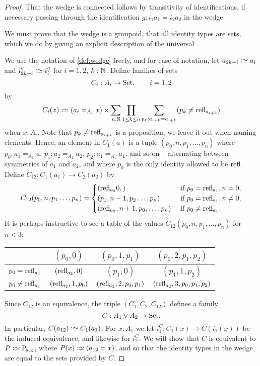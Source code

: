 \begin{proof}
  That the wedge is connected follows by transitivity of identifications,
  if necessary passing through the identification $g:i_1a_1=i_2a_2$ in the wedge.

We must prove that the wedge is a groupoid, \ie that all identity types are sets, which we do by giving an explicit description of the universal \covering.

 We use the notation of \cref{def:wedge} freely, and for ease of notation, let $a_{2k+i}\defequi a_i$ and $i_{2k+i}^g\defequi i_i^g$ for $i=1,2$, $k:\mathbb{N}$.
Define families of sets
$$C_i:A_i\to\mathrm{Set},\qquad i=1,2$$
by
$$
C_i(x)\defequi(a_i=_{A_i}x)\times
\sum_{n:\NN}\prod_{1\leq k\leq n}\sum_{p_k:a_{i+k}= a_{i+k}}(p_k\neq\refl {a_{i+k}})
$$
when $x:A_i$.  Note that $p_k\neq\mathrm{refl}_{a_{i+k}}$  is a proposition; we leave it out when naming elements. Hence, an element in $C_1(a)$ is a tuple
$(p_0,n,p_1,\dots,p_n)$ where $p_0:a_1=_{A_1}a$, $p_1:a_2=_{A_2}a_2$, $p_2:a_1=_{A_1}a_1$, and so on -- alternating between symmetries of $a_1$ and $a_2$, and where $p_0$ is the only identity allowed to be $\mathrm{refl}_{}$. Define $C_{12}:C_1(a_1)\to C_2(a_2)$ by
$$C_{12}(p_0,n,p_1\dots,p_n)=
\begin{cases}
  (\mathrm{refl}_{a_2}0,)&\text{ if }p_0=\mathrm{refl}_{a_1}, n=0,\\
  (p_1,n-1,p_2\dots,p_n)& \text{ if }p_0=\mathrm{refl}_{a_1},n\neq0,\\
  (\mathrm{refl}_{a_2},n+1,p_0,\dots,p_n)& \text{ if }p_0\neq\mathrm{refl}_{a_1}.
\end{cases}
$$
It is perhaps instructive to see a table of the values $C_{12}(p_0,n,p_1,\dots,p_n)$ for $n<3$:
\begin{center}
  \begin{tabular}{r|c cc}
    &$(p_0,0)$&$(p_0,1,p_1)$&$(p_0,2,p_1,p_2)$\\
    \hline
    $p_0=\mathrm{refl}_{a_1}$&$(\mathrm{refl}_{a_2},0)$&$(p_1,0)$&$(p_1,1,p_2)$\\
    $p_0\neq\mathrm{refl}_{a_1}$&$(\mathrm{refl}_{a_2},1,p_0)$&$(\mathrm{refl}_{a_2},2,p_0,p_1)$&$(\mathrm{refl}_{a_2},3,p_0,p_1,p_2)$
  \end{tabular}
\end{center}
Since $C_{12}$ is an equivalence, the triple $(C_1,C_2,C_{12})$ defines a family
$$C:A_1\vee A_2\to\mathrm{Set}.$$
In particular, $C(a_{12})\defequi C_1(a_1)$.
For $x:A_1$ we let $i^C_1:C_1(x)\to C(i_1(x))$ be the induced equivalence, and likewise for $i^C_2$.
We will show that $C$ is equivalent to $P\defequi \pathsp{a_{12}}$, where $P(x)\defequi(a_{12}=x)$, and so that the identity types in the wedge are equal to the sets provided by $C$.


\end{proof}
